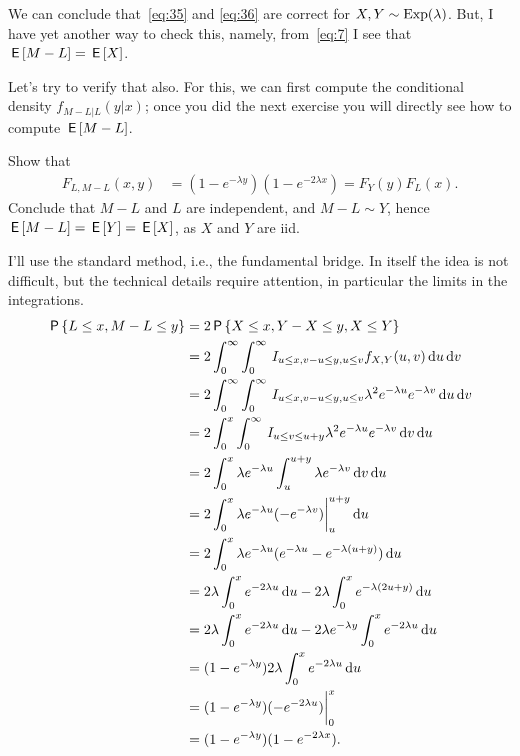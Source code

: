 \documentclass[a4paper,11pt]{article}
\begin{document}
We can conclude that~\cref{eq:35} and \cref{eq:36} are correct for $X,Y\sim\mathrm{Exp}(\lambda)$.
But, I have yet another way to check this, namely, from~\cref{eq:7} I see that $\,\mathsf{E}\left[M-L\right] = \,\mathsf{E}\left[X\right]$.

Let's try to verify that also.
For this, we can first compute the conditional density $f_{M-L| L}(y| x)$; once you did the next exercise you will directly see how to compute $\,\mathsf{E}\left[M-L\right]$.

\begin{exercise}\label{ex:5}
Show that
\begin{align}  \label{eq:23}
F_{L,M-L}(x,y) &= (1-e^{-\lambda y})(1- e^{-2\lambda x}) = F_Y(y) F_L(x).
\end{align}
Conclude that $M-L$ and $L$ are independent, and $M-L\sim Y$, hence $\,\mathsf{E}\left[M-L\right] = \,\mathsf{E}\left[Y\right] = \,\mathsf{E}\left[X\right]$, as $X$ and $Y$ are iid.
\begin{solution}
I'll use the standard method, i.e., the fundamental bridge.
In itself the idea is not difficult, but the technical details require attention, in particular the limits in the integrations.
\begin{align}
\,\mathsf{P}\left\{L\leq x, M-L\leq y\right\}
&= 2\,\mathsf{P}\left\{X\leq x, Y-X \leq y, X \leq Y\right\} \\
&= 2\int_0^{\infty} \int_0^{\infty} \,I_{u\leq x, v-u\leq y, u \leq v} f_{X,Y}(u, v)  \,\textrm{d}u \,\textrm{d}v\\
&= 2\int_0^{\infty} \int_0^{\infty} \,I_{u\leq x, v-u\leq y, u\leq v} \lambda^2e^{-\lambda u}e^{-\lambda v}\,\textrm{d}u \,\textrm{d}v\\
&= 2\int_0^{x} \int_0^{\infty} \,I_{u\leq v\leq u+y} \lambda^2e^{-\lambda u}e^{-\lambda v}\,\textrm{d}v \,\textrm{d}u\\
&= 2\int_0^{x} \lambda e^{-\lambda u} \int_u   ^{u + y}  \lambda e^{-\lambda v}\,\textrm{d}v \,\textrm{d}u\\
&= 2\int_0^{x} \lambda e^{-\lambda u} (-e^{-\lambda v}) \biggr|_u^{u+y}\,\textrm{d}u \\
&= 2\int_0^{x} \lambda e^{-\lambda u} (e^{-\lambda u} - e^{-\lambda (u+y)})\,\textrm{d}u \\
&= 2\lambda\int_0^{x}  e^{-2 \lambda u}\,\textrm{d}u  - 2\lambda \int_{0}^{x} e^{-\lambda (2u+y)}\,\textrm{d}u \\
&= 2\lambda\int_0^{x}  e^{-2 \lambda u}\,\textrm{d}u  - 2\lambda e^{-\lambda y }\int_{0}^{x} e^{-2 \lambda u}\,\textrm{d}u \\
&= (1-e^{-\lambda y}) 2 \lambda \int_0^{x} e^{-2 \lambda u} \,\textrm{d}u\\
&= (1-e^{-\lambda y}) ( -e^{-2\lambda u}) \biggr|_0^{x} \\
&= (1-e^{-\lambda y})(1- e^{-2\lambda x}).
\end{align}
\end{solution}
\end{exercise}
\end{document}

